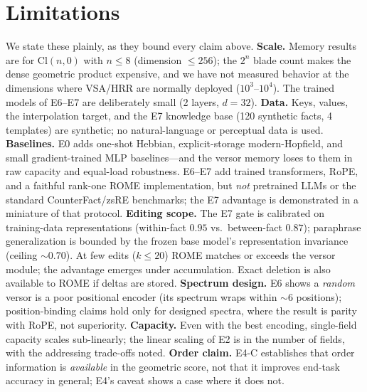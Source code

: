 \documentclass[10pt,twocolumn]{article}
\newcommand{\Cl}{\mathrm{Cl}}
\begin{document}
\section{Limitations}
\label{sec:limits}
We state these plainly, as they bound every claim above.
\textbf{Scale.} Memory results are for $\Cl(n,0)$ with $n\le 8$ (dimension
$\le256$); the $2^n$ blade count makes the dense geometric product expensive, and
we have not measured behavior at the dimensions where VSA/HRR are normally
deployed ($10^3$--$10^4$). The trained models of E6--E7 are deliberately small
(2 layers, $d{=}32$).
\textbf{Data.} Keys, values, the interpolation target, and the E7 knowledge base
(120 synthetic facts, 4 templates) are synthetic; no natural-language or
perceptual data is used.
\textbf{Baselines.} E0 adds one-shot Hebbian, explicit-storage modern-Hopfield,
and small gradient-trained MLP baselines---and the versor memory loses to them
in raw capacity and equal-load robustness. E6--E7 add trained transformers,
RoPE, and a faithful rank-one ROME implementation, but \emph{not} pretrained
LLMs or the standard CounterFact/zsRE benchmarks; the E7 advantage is
demonstrated in a miniature of that protocol.
\textbf{Editing scope.} The E7 gate is calibrated on training-data
representations (within-fact $0.95$ vs.\ between-fact $0.87$); paraphrase
generalization is bounded by the frozen base model's representation invariance
(ceiling ${\sim}0.70$). At few edits ($k\le20$) ROME matches or exceeds the
versor module; the advantage emerges under accumulation. Exact deletion is also
available to ROME if deltas are stored.
\textbf{Spectrum design.} E6 shows a \emph{random} versor is a poor positional
encoder (its spectrum wraps within ${\sim}6$ positions); position-binding
claims hold only for designed spectra, where the result is parity with RoPE,
not superiority.
\textbf{Capacity.} Even with the best encoding, single-field capacity scales
sub-linearly; the linear scaling of E2 is in the number of fields, with the
addressing trade-offs noted.
\textbf{Order claim.} E4-C establishes that order information is \emph{available}
in the geometric score, not that it improves end-task accuracy in general; E4's
caveat shows a case where it does not.
\end{document}
